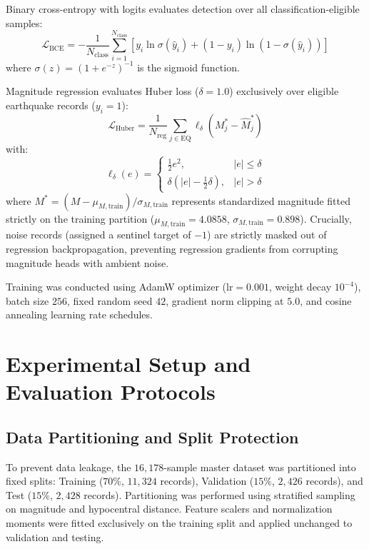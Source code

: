 \documentclass[journal]{IEEEtran}
\begin{document}
Binary cross-entropy with logits evaluates detection over all classification-eligible samples:
\begin{equation}
\mathcal{L}_{\text{BCE}} = - \frac{1}{N_{\text{class}}} \sum_{i=1}^{N_{\text{class}}} \left[ y_i \ln \sigma(\hat{y}_i) + (1 - y_i) \ln(1 - \sigma(\hat{y}_i)) \right]
\label{eq:bce_loss}
\end{equation}
where $\sigma(z) = (1 + e^{-z})^{-1}$ is the sigmoid function.

Magnitude regression evaluates Huber loss ($\delta = 1.0$) exclusively over eligible earthquake records ($y_i = 1$):
\begin{equation}
\mathcal{L}_{\text{Huber}} = \frac{1}{N_{\text{reg}}} \sum_{j \in \text{EQ}} \ell_\delta(M_j^* - \hat{M}_j^*)
\label{eq:huber_loss}
\end{equation}
with:
\begin{equation}
\ell_\delta(e) = 
\begin{cases}
\frac{1}{2} e^2, & |e| \le \delta \\
\delta (|e| - \frac{1}{2} \delta), & |e| > \delta
\end{cases}
\end{equation}
where $M^* = (M - \mu_{M, \text{train}}) / \sigma_{M, \text{train}}$ represents standardized magnitude fitted strictly on the training partition ($\mu_{M, \text{train}} = 4.0858$, $\sigma_{M, \text{train}} = 0.898$). Crucially, noise records (assigned a sentinel target of $-1$) are strictly masked out of regression backpropagation, preventing regression gradients from corrupting magnitude heads with ambient noise.

Training was conducted using AdamW optimizer ($\text{lr} = 0.001$, weight decay $10^{-4}$), batch size $256$, fixed random seed $42$, gradient norm clipping at $5.0$, and cosine annealing learning rate schedules.

\section{Experimental Setup and Evaluation Protocols}

\subsection{Data Partitioning and Split Protection}
To prevent data leakage, the $16,178$-sample master dataset was partitioned into fixed splits: Training ($70\%$, $11,324$ records), Validation ($15\%$, $2,426$ records), and Test ($15\%$, $2,428$ records). Partitioning was performed using stratified sampling on magnitude and hypocentral distance. Feature scalers and normalization moments were fitted exclusively on the training split and applied unchanged to validation and testing.
\end{document}
